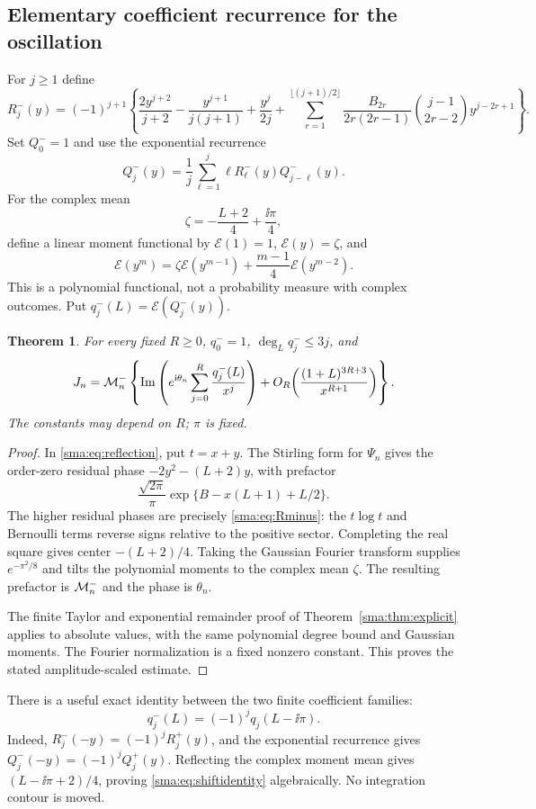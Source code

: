 \documentclass[11pt,letterpaper]{article}
\numberwithin{equation}{section}
\newtheorem{theorem}{Theorem}[section]\newtheorem{lemma}[theorem]{Lemma}\newtheorem{proposition}[theorem]{Proposition}\newtheorem{corollary}[theorem]{Corollary}\theoremstyle{remark}\newtheorem{remark}[theorem]{Remark}
\begin{document}
\subsection{Elementary coefficient recurrence for the oscillation}
For $j\ge1$ define
\begin{equation}\label{sma:eq:Rminus}
 R_j^-(y)=(-1)^{j+1}\left\{
 \frac{2y^{j+2}}{j+2}-\frac{y^{j+1}}{j(j+1)}+\frac{y^j}{2j}
 +\sum_{r=1}^{\lfloor(j+1)/2\rfloor}
 \frac{B_{2r}}{2r(2r-1)}\binom{j-1}{2r-2}y^{j-2r+1}\right\}.
\end{equation}
Set $Q_0^-=1$ and use the exponential recurrence
\[
 Q_j^-(y)=\frac1j\sum_{\ell=1}^j\ell R_\ell^-(y)Q_{j-\ell}^-(y).
\]
For the complex mean
\[
 \zeta=-\frac{L+2}{4}+\frac{\ii\pi}{4},
\]
define a linear moment functional by $\mathcal E(1)=1$, $\mathcal E(y)=\zeta$, and
\[
 \mathcal E(y^m)=\zeta\mathcal E(y^{m-1})+\frac{m-1}{4}\mathcal E(y^{m-2}).
\]
This is a polynomial functional, not a probability measure with complex outcomes. Put $q_j^-(L)=\mathcal E(Q_j^-(y))$.

\begin{theorem}\label{sma:thm:Jexplicit}
For every fixed $R\ge0$, $q_0^-=1$, $\deg_L q_j^-\le3j$, and
\begin{equation}\label{sma:eq:Jexplicit}
 J_n=\mathcal M_n^-\left\{\operatorname{Im}\left(e^{\mathrm i\theta_n}
 \sum_{j=0}^R\frac{q_j^-(L)}{x^j}\right)
 +O_R\!\left(\frac{(1+L)^{3R+3}}{x^{R+1}}\right)\right\}.
\end{equation}
The constants may depend on $R$; $\pi$ is fixed.
\end{theorem}
\begin{proof}
In \eqref{sma:eq:reflection}, put $t=x+y$. The Stirling form for $\Psi_n$ gives the order-zero residual phase $-2y^2-(L+2)y$, with prefactor
\[
 \frac{\sqrt{2\pi}}\pi\exp\{B-x(L+1)+L/2\}.
\]
The higher residual phases are precisely \eqref{sma:eq:Rminus}: the $t\log t$ and Bernoulli terms reverse signs relative to the positive sector. Completing the real square gives center $-(L+2)/4$. Taking the Gaussian Fourier transform supplies $e^{-\pi^2/8}$ and tilts the polynomial moments to the complex mean $\zeta$. The resulting prefactor is $\mathcal M_n^-$ and the phase is $\theta_n$.

The finite Taylor and exponential remainder proof of Theorem~\ref{sma:thm:explicit} applies to absolute values, with the same polynomial degree bound and Gaussian moments. The Fourier normalization is a fixed nonzero constant. This proves the stated amplitude-scaled estimate.
\end{proof}
There is a useful exact identity between the two finite coefficient families:
\begin{equation}\label{sma:eq:shiftidentity}
 q_j^-(L)=(-1)^j q_j(L-\ii\pi).
\end{equation}
Indeed, $R_j^-(-y)=(-1)^jR_j^+(y)$, and the exponential recurrence gives $Q_j^-(-y)=(-1)^jQ_j^+(y)$. Reflecting the complex moment mean gives $(L-\ii\pi+2)/4$, proving \eqref{sma:eq:shiftidentity} algebraically. No integration contour is moved.
\end{document}
